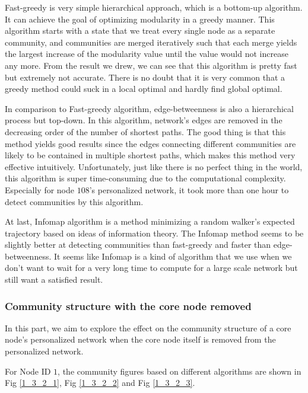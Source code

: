 \documentclass[11pt]{article}
\begin{document}
Fast-greedy is very simple hierarchical approach, which is a bottom-up algorithm. It can achieve the goal of optimizing modularity in a greedy manner. This algorithm starts with a state that we treat every single node as a separate community, and communities are merged iteratively such that each merge yields the largest increase of the modularity value until the value would not increase any more. From the result we drew, we can see that this algorithm is pretty fast but extremely not accurate. There is no doubt that it is very common that a greedy method could suck in a local optimal and hardly find global optimal.

In comparison to Fast-greedy algorithm, edge-betweenness is also a hierarchical process but top-down. In this algorithm, network's edges are removed in the decreasing order of the number of shortest paths. The good thing is that this method yields good results since the edges connecting different communities are likely to be contained in multiple shortest paths, which makes this method very effective intuitively. Unfortunately, just like there is no perfect thing in the world, this algorithm is super time-consuming due to the computational complexity. Especially for node $108$'s personalized network, it took more than one hour to detect communities by this algorithm.

At last, Infomap algorithm is a method minimizing a random walker’s expected trajectory based on ideas of information theory. The Infomap method seems to be slightly better at detecting communities than fast-greedy and faster than edge-betweenness. It seems like Infomap is a kind of algorithm that we use when we don't want to wait for a very long time to compute for a large scale network but still want a satisfied result.

\subsubsection{Community structure with the core node removed}

In this part, we aim to explore the effect on the community structure of a core node’s personalized network when the core node itself is removed from the personalized network.

For Node ID $1$, the community figures based on different algorithms are shown in Fig \ref{1_3_2_1}, Fig \ref{1_3_2_2} and Fig \ref{1_3_2_3}.
\end{document}
